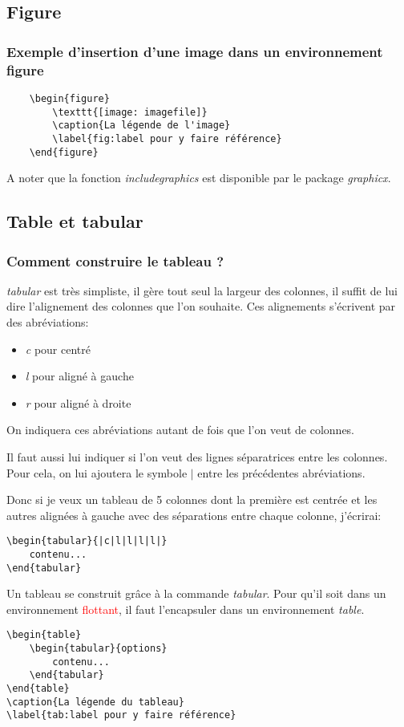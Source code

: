 \documentclass{beamer}
\begin{document}
\subsection{Figure}
\begin{frame}[fragile]
	\frametitle{Exemple d'insertion d'une image dans un environnement figure}
	\begin{Verbatim}
	\begin{figure}
		\texttt{[image: imagefile]}
		\caption{La légende de l'image}
		\label{fig:label pour y faire référence}
	\end{figure}
	\end{Verbatim}
	\vspace{.2cm}
	A noter que la fonction \textit{includegraphics} est disponible par le package \textit{graphicx}.
\end{frame}

\subsection{Table et tabular}
\begin{frame}[fragile]
	\frametitle{Comment construire le tableau ?}
	\textit{tabular} est très simpliste, il gère tout seul la largeur des colonnes, il suffit de lui dire l'alignement des colonnes que l'on souhaite. Ces alignements s'écrivent par des abréviations:
	\begin{itemize}
		\item \textit{c} pour centré
		\item \textit{l} pour aligné à gauche
		\item \textit{r} pour aligné à droite
	\end{itemize}
	On indiquera ces abréviations autant de fois que l'on veut de colonnes.
	
	Il faut aussi lui indiquer si l'on veut des lignes séparatrices entre les colonnes. Pour cela, on lui ajoutera le symbole $\mid$ entre les précédentes abréviations.
\end{frame}

\begin{frame}[fragile]
	Donc si je veux un tableau de 5 colonnes dont la première est centrée et les autres alignées à gauche avec des séparations entre chaque colonne, j'écrirai:
\begin{Verbatim}
\begin{tabular}{|c|l|l|l|l|}
	contenu...
\end{tabular}
\end{Verbatim}
\end{frame}

\begin{frame}[fragile]
	Un tableau se construit grâce à la commande \textit{tabular}. Pour qu'il soit dans un environnement \textcolor{red}{flottant}, il faut l'encapsuler dans un environnement \textit{table}.
\begin{Verbatim}
\begin{table}
	\begin{tabular}{options}
		contenu...
	\end{tabular}
\end{table}
\caption{La légende du tableau}
\label{tab:label pour y faire référence}
\end{Verbatim}
\end{frame}
\end{document}
